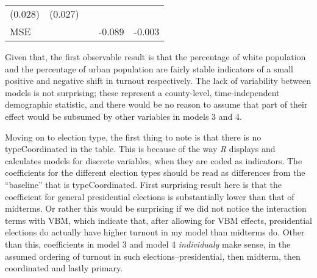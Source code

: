 \documentclass[12pt,twoside]{reedthesis}
\begin{document}
\begin{longtable}[]{@{}lcccc@{}}
\begin{minipage}[t]{0.20\columnwidth}
  (0.028)\strut
  \end{minipage} & \begin{minipage}[t]{0.11\columnwidth}\centering\strut
  (0.027)\strut
  \end{minipage}\tabularnewline
  \begin{minipage}[t]{0.23\columnwidth}\raggedright\strut
  MSE\strut
  \end{minipage} & \begin{minipage}[t]{0.14\columnwidth}\centering\strut
  \strut
  \end{minipage} & \begin{minipage}[t]{0.18\columnwidth}\centering\strut
  \strut
  \end{minipage} & \begin{minipage}[t]{0.20\columnwidth}\centering\strut
  -0.089\strut
  \end{minipage} & \begin{minipage}[t]{0.11\columnwidth}\centering\strut
  -0.003\strut
  \end{minipage}\tabularnewline
  \bottomrule
  \end{longtable}
  
  Given that, the first observable result is that the percentage of white
  population and the percentage of urban population are fairly stable
  indicators of a small positive and negative shift in turnout
  respectively. The lack of variability between models is not surprising;
  these represent a county-level, time-independent demographic statistic,
  and there would be no reason to assume that part of their effect would
  be subsumed by other variables in models 3 and 4.
  
  Moving on to election type, the first thing to note is that there is no
  typeCoordinated in the table. This is because of the way \textit{R}
  displays and calculates models for discrete variables, when they are
  coded as indicators. The coefficients for the different election types
  should be read as differences from the ``baseline'' that is
  typeCoordinated. First surprising result here is that the coefficient
  for general presidential elections is substantially lower than that of
  midterms. Or rather this would be surprising if we did not notice the
  interaction terms with VBM, which indicate that, after allowing for VBM
  effects, presidential elections do actually have higher turnout in my
  model than midterms do. Other than this, coefficients in model 3 and
  model 4 \emph{individualy} make sense, in the assumed ordering of
  turnout in such elections--presidential, then midterm, then coordinated
  and lastly primary.
  
\end{document}
